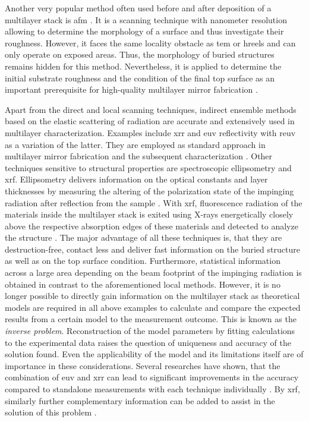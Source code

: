 Another very popular method often used before and after deposition of a multilayer stack is \gls{afm} \cite{binnig_atomic_1986}. It is a scanning technique with nanometer resolution allowing to determine the morphology of a surface and thus investigate their roughness. However, it faces the same locality obstacle as \gls{tem} or \gls{hreels} and can only operate on exposed areas. Thus, the morphology of buried structures remains hidden for this method. Nevertheless, it is applied to determine the initial substrate roughness and the condition of the final top surface as an important prerequisite for high-quality multilayer mirror fabrication \cite{louis_progress_2000, bajt_investigation_2001}.

Apart from the direct and local scanning techniques, indirect ensemble methods based on the elastic scattering of radiation are accurate and extensively used in multilayer characterization. Examples include \gls{xrr} and \gls{euv} reflectivity with \gls{reuv} as a variation of the latter. They are employed as standard approach in multilayer mirror fabrication and the subsequent characterization \cite{lim_fabrication_2001, bajt_investigation_2001, braun_mo/si_2002}. Other techniques sensitive to structural properties are spectroscopic ellipsometry and \Gls{xrf}. Ellipsometry delivers information on the optical constants and layer thicknesses by measuring the altering of the polarization state of the impinging radiation after reflection from the sample \cite{arwin_unambiguous_1984, liu_thickness_1999}. With \gls{xrf}, fluorescence radiation of the materials inside the multilayer stack is exited using X-rays energetically closely above the respective absorption edges of these materials and detected to analyze the structure \cite{kortright_standing_1987, kawamura_interface_1994}. The major advantage of all these techniques is, that they are destruction-free, contact less and deliver fast information on the buried structure as well as on the top surface condition. Furthermore, statistical information across a large area depending on the beam footprint of the impinging radiation is obtained in contrast to the aforementioned local methods. However, it is no longer possible to directly gain information on the multilayer stack as theoretical models are required in all above examples to calculate and compare the expected results from a certain model to the measurement outcome. This is known as the \emph{inverse problem}. Reconstruction of the model parameters by fitting calculations to the experimental data raises the question of uniqueness and accuracy of the solution found. Even the applicability of the model and its limitations itself are of importance in these considerations. Several researches have shown, that the combination of \gls{euv} and \gls{xrr} can lead to significant improvements in the accuracy compared to standalone measurements with each technique individually \cite{yakunin_combined_2014}. By \Gls{xrf}, similarly further complementary information can be added to assist in the solution of this problem \cite{ghose_x-ray_2001}.

